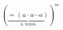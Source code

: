 \documentclass[preview]{standalone}
\begin{document}
\begin{align*}
(\underbrace{=(a \cdot a \cdots a)}_{n \text{ vezes}})^m
\end{align*}
\end{document}

